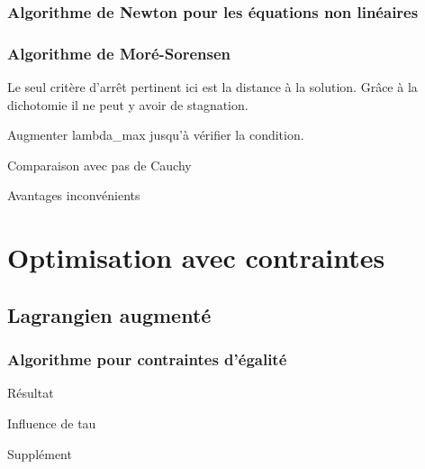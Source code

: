 \documentclass[a4paper,12pt]{article}
\begin{document}
\subsubsection{Algorithme de Newton pour les équations non linéaires}
\subsubsection{Algorithme de Moré-Sorensen}

Le seul critère d'arrêt pertinent ici est la distance à la solution. Grâce à la dichotomie il ne peut y avoir de stagnation.

Augmenter lambda\_max jusqu'à vérifier la condition.

Comparaison avec pas de Cauchy

Avantages inconvénients

\newpage
\section{Optimisation avec contraintes}

\subsection{Lagrangien augmenté}
\subsubsection{Algorithme pour contraintes d'égalité}

Résultat

Influence de tau

Supplément
\end{document}
